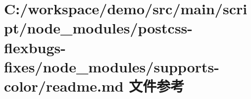 \hypertarget{node__modules_2postcss-flexbugs-fixes_2node__modules_2supports-color_2_r_e_a_d_m_e_8md}{}\section{C\+:/workspace/demo/src/main/script/node\+\_\+modules/postcss-\/flexbugs-\/fixes/node\+\_\+modules/supports-\/color/readme.md 文件参考}
\label{node__modules_2postcss-flexbugs-fixes_2node__modules_2supports-color_2_r_e_a_d_m_e_8md}
